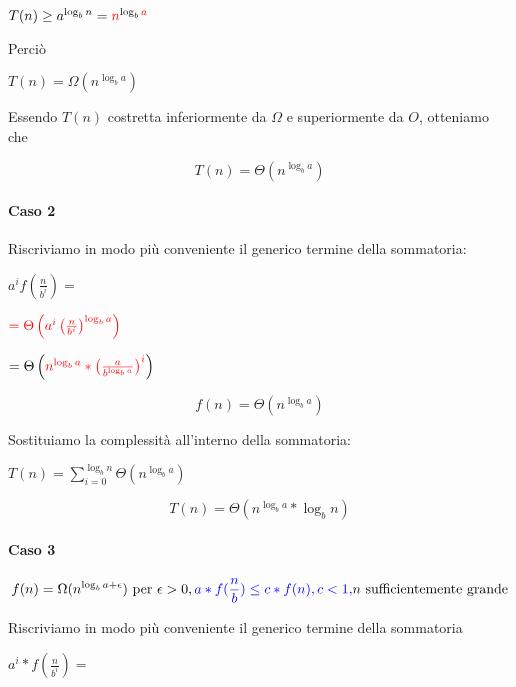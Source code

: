 $T(n) \geq a^{\log_b{n}} = \textcolor{red}{n}^{\log_b{\textcolor{red}{a}}}$

Perciò 

$T(n) = \Omega(n^{\log_b{a}})$

Essendo $T(n)$ costretta inferiormente da $\Omega$ e superiormente da $O$, otteniamo che

\begin{equation}
T(n) = \Theta(n^{\log_b{a}})
\end{equation}

\paragraph{Caso 2}

Riscriviamo in modo più conveniente il generico termine della sommatoria:

$a^if\left(\frac{n}{b^i}\right)=$

$\textcolor{red}{=\Theta\left(a^i\left(\frac{n}{b^i}\right)^{\log_b{a}}\right)}$

$=\Theta\left(\textcolor{red}{n^{\log_b{a}} * \left( \frac{a}{b^{\log_b{a}}} \right)^i} \right)$

\begin{equation}
f(n) = \Theta(n^{\log_b{a}})
\end{equation}

Sostituiamo la complessità all'interno della sommatoria:

$T(n) = \sum_{i=0}^{\log_b{n}}{\Theta(n^{\log_b{a}})}$

\begin{equation}
T(n) = \Theta(n^{\log_b{a}}*\log_b{n})
\end{equation}

\paragraph{Caso 3}

\begin{equation}
f(n) = \Omega(n^{\log_b{a} + \epsilon})  \mbox{ per } \epsilon > 0, \\ 
\textcolor{blue}{a*f(\frac{n}{b}) \leq c*f(n), \\ 
c < 1,} \\
n \mbox{ sufficientemente grande}
\end{equation}

Riscriviamo in modo più conveniente il generico termine della sommatoria

$a^i * f\left(\frac{n}{b^i}\right)=$

